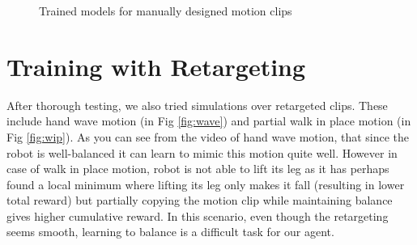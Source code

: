 \begin{figure}[!ht]
    \centering
    \qquad
    \qquad
    \label{fig:x1}
    \caption{Trained models for manually designed motion clips}
\end{figure}

\newpage
\section{Training with Retargeting}

After thorough testing, we also tried simulations over retargeted clips. These include hand wave motion (in Fig \ref{fig:wave}) and partial walk in place motion (in Fig \ref{fig:wip}). As you can see from the video of hand wave motion, that since the robot is well-balanced it can learn to mimic this motion quite well. However in case of walk in place motion, robot is not able to lift its leg as it has perhaps found a local minimum where lifting its leg only makes it fall (resulting in lower total reward) but partially copying the motion clip while maintaining balance gives higher cumulative reward. In this scenario, even though the retargeting seems smooth, learning to balance is a difficult task for our agent.

